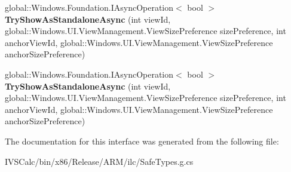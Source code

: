\begin{DoxyCompactItemize}
\item 
\mbox{\label{interface_windows_1_1_u_i_1_1_view_management_1_1_i_application_view_switcher_statics_a8d678f11615411f739842f3002f360f0}} 
global\+::\+Windows.\+Foundation.\+I\+Async\+Operation$<$ bool $>$ {\bfseries Try\+Show\+As\+Standalone\+Async} (int view\+Id, global\+::\+Windows.\+U\+I.\+View\+Management.\+View\+Size\+Preference size\+Preference, int anchor\+View\+Id, global\+::\+Windows.\+U\+I.\+View\+Management.\+View\+Size\+Preference anchor\+Size\+Preference)
\item 
\mbox{\label{interface_windows_1_1_u_i_1_1_view_management_1_1_i_application_view_switcher_statics_a8d678f11615411f739842f3002f360f0}} 
global\+::\+Windows.\+Foundation.\+I\+Async\+Operation$<$ bool $>$ {\bfseries Try\+Show\+As\+Standalone\+Async} (int view\+Id, global\+::\+Windows.\+U\+I.\+View\+Management.\+View\+Size\+Preference size\+Preference, int anchor\+View\+Id, global\+::\+Windows.\+U\+I.\+View\+Management.\+View\+Size\+Preference anchor\+Size\+Preference)
\end{DoxyCompactItemize}


The documentation for this interface was generated from the following file\+:\begin{DoxyCompactItemize}
\item 
I\+V\+S\+Calc/bin/x86/\+Release/\+A\+R\+M/ilc/Safe\+Types.\+g.\+cs\end{DoxyCompactItemize}
